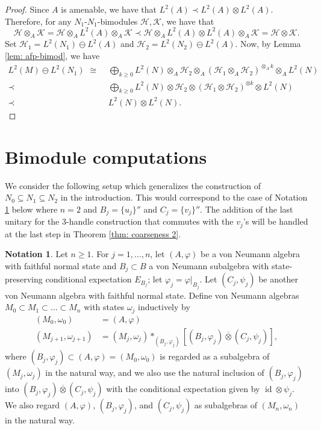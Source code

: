 \documentclass[10pt]{amsart}
\numberwithin{equation}{section}
\theoremstyle{definition}
\newtheorem{notation}[thm]{Notation}
\newcommand{\cH}{\mathcal{H}}
\newcommand{\cK}{\mathcal{K}}
\newcommand{\id}{\operatorname{id}}
\newcommand{\ootimes}{\mathbin{\overline{\otimes}}}
\begin{document}
\begin{proof}
    Since $A$ is amenable, we have that $L^2(A)\prec L^2(A)\otimes L^2(A)$. Therefore, for any $N_1$-$N_1$-bimodules $\cH,\cK$, we have that 
    $$\cH\otimes_A\cK = \cH\otimes_A L^2(A) \otimes_A\cK \prec \cH\otimes_A L^2(A)\otimes L^2(A)\otimes_A\cK = \cH\otimes\cK.$$
    Set $\cH_1 = L^2(N_1) \ominus L^2(A)$ and $\cH_2 = L^2(N_2)\ominus L^2(A)$. Now, by Lemma \ref{lem: afp-bimod}, we have 
    \begin{align*}
L^2(M) \ominus L^2(N_1)
\,\, \cong \,\, & \bigoplus_{k \geq 0} L^2(N) \otimes_A \cH_2 \otimes_{A} (\cH_1 \otimes_A \cH_2)^{\otimes_A k} \otimes_A L^2(N)\\
\prec \, \, & \bigoplus_{k \geq 0} L^2(N) \otimes \cH_2 \otimes (\cH_1 \otimes \cH_2)^{\otimes k} \otimes L^2(N)\\
\prec \, \, & L^2(N) \otimes L^2(N).
\end{align*}
\end{proof}

\section{Bimodule computations} \label{sec: bimodule computation}

We consider the following setup which generalizes the construction of $N_0 \subseteq N_1 \subseteq N_2$ in the introduction.  This would correspond to the case of Notation \ref{not: free product setup} below where $n = 2$ and $B_j = \{u_j\}''$ and $C_j = \{v_j\}''$.  The addition of the last unitary for the $3$-handle construction that commutes with the $v_j$'s will be handled at the last step in Theorem \ref{thm: coarseness 2}.

\begin{notation} \label{not: free product setup}
	Let $n \geq 1$.  For $j=1, \dots, n$, let $(A,\varphi)$ be a von Neumann algebra with faithful normal state and $B_j \subset B$ a von Neumann subalgebra with state-preserving conditional expectation $E_{B_j}$; let $\varphi_j = \varphi|_{B_j}$.  Let $(C_j,\psi_j)$ be another von Neumann algebra with faithful normal state.  Define von Neumann algebras $M_0 \subset M_1 \subset \dots \subset M_n$ with states $\omega_j$ inductively by
	\begin{align*}
		(M_0,\omega_0) &= (A,\varphi) \\
		(M_{j+1},\omega_{j+1}) &= (M_j,\omega_j) *_{(B_j,\varphi_j)} [(B_j,\varphi_j) \ootimes (C_j,\psi_j)],
	\end{align*}
	where $(B_j,\varphi_j) \subset (A,\varphi) = (M_0,\omega_0)$ is regarded as a subalgebra of $(M_j,\omega_j)$ in the natural way, and we also use the natural inclusion of $(B_j,\varphi_j)$ into $(B_j,\varphi_j) \ootimes (C_j,\psi_j)$ with the conditional expectation given by $\id \otimes \psi_j$.  We also regard $(A,\varphi)$, $(B_j,\varphi_j)$, and $(C_j,\psi_j)$ as subalgebras of $(M_n,\omega_n)$ in the natural way.
\end{notation}
\end{document}
